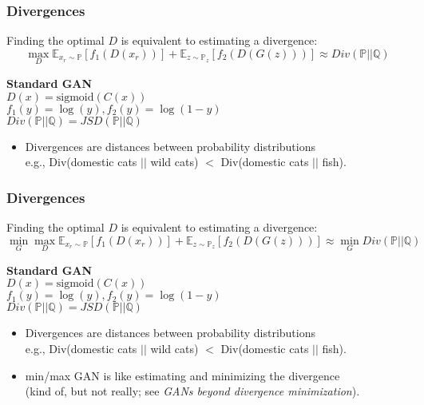 \documentclass[t]{beamer}
\begin{document}
\begin{frame}
	\frametitle{Divergences}
	Finding the optimal $D$ is equivalent to estimating a divergence:
	\vspace*{-5pt}
	$$\max_D \mathbb{E}_{x_r \sim \mathbb{P}}\left[ f_1(D(x_r)) \right] + \mathbb{E}_{z \sim \mathbb{P}_z} \left[ f_2(D(G(z))) \right] \approx Div(\mathbb{P}||\mathbb{Q})$$
	
	\begin{center}
		\textbf{Standard GAN} \\
		$D(x)=\text{sigmoid}(C(x))$ \\
		$f_1(y)=\log(y), f_2(y)=\log(1-y)$ \\
		$Div(\mathbb{P}||\mathbb{Q}) =  JSD(\mathbb{P}||\mathbb{Q})$
	\end{center}
	
	\begin{itemize}
		\item Divergences are distances between probability distributions \\ e.g., Div(domestic cats $||$ wild cats) $<$ Div(domestic cats $||$ fish).
	\end{itemize}
	
\end{frame}


\begin{frame}
	\frametitle{Divergences}
	Finding the optimal $D$ is equivalent to estimating a divergence:
	$$\min_G \max_D \mathbb{E}_{x_r \sim \mathbb{P}}\left[ f_1(D(x_r)) \right] + \mathbb{E}_{z \sim \mathbb{P}_z} \left[ f_2(D(G(z))) \right] \approx \min_G Div(\mathbb{P}||\mathbb{Q})$$ 
	
	\begin{center}
	\textbf{Standard GAN} \\
	$D(x)=\text{sigmoid}(C(x))$ \\
	$f_1(y)=\log(y), f_2(y)=\log(1-y)$ \\
	$Div(\mathbb{P}||\mathbb{Q}) =  JSD(\mathbb{P}||\mathbb{Q})$
	\end{center}
	
	\begin{itemize}
		\item Divergences are distances between probability distributions \\ e.g., Div(domestic cats $||$ wild cats) $<$ Div(domestic cats $||$ fish).
		\item min/max GAN is like estimating and minimizing the divergence \\ (kind of, but not really; see \textit{GANs beyond divergence minimization}).
	\end{itemize}
	
\end{frame}
\end{document}
